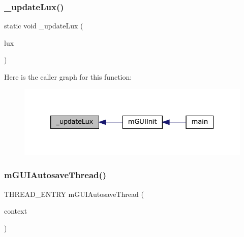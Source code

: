 \subsubsection{\texorpdfstring{\+\_\+update\+Lux()}{\_updateLux()}}
{\footnotesize\ttfamily static void \+\_\+update\+Lux (\begin{DoxyParamCaption}\item[{struct G\+B\+A\+Luminance\+Source $\ast$}]{lux }\end{DoxyParamCaption})\hspace{0.3cm}{\ttfamily [static]}}

Here is the caller graph for this function\+:
\nopagebreak
\begin{figure}[H]
\begin{center}
\leavevmode
\includegraphics[width=326pt]{gui-runner_8c_a1a8cb97eac74d065473cb0b7554c72ca_icgraph}
\end{center}
\end{figure}
\mbox{\label{gui-runner_8c_a893aeb86364bda67a415a000c4a690d6}} 
\subsubsection{\texorpdfstring{m\+G\+U\+I\+Autosave\+Thread()}{mGUIAutosaveThread()}}
{\footnotesize\ttfamily T\+H\+R\+E\+A\+D\+\_\+\+E\+N\+T\+RY m\+G\+U\+I\+Autosave\+Thread (\begin{DoxyParamCaption}\item[{void $\ast$}]{context }\end{DoxyParamCaption})}

